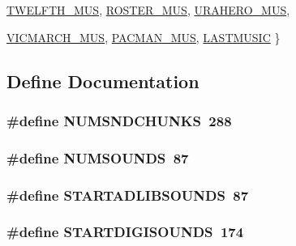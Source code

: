 \begin{DoxyCompactItemize}
\hyperlink{BUDIOWL6_8H_a196fbe29c4c02d90973f0b611ed0958ba2daba453f800e809bfb4fca6124da377}{TWELFTH\_\-MUS}, 
\hyperlink{BUDIOWL6_8H_a196fbe29c4c02d90973f0b611ed0958ba69e9e273ab13839b09e0976829002046}{ROSTER\_\-MUS}, 
\hyperlink{BUDIOWL6_8H_a196fbe29c4c02d90973f0b611ed0958ba7a71704b46eb8baaa32e6f817634328d}{URAHERO\_\-MUS}, 
\par
\hyperlink{BUDIOWL6_8H_a196fbe29c4c02d90973f0b611ed0958ba26a6deb65452e9b3f46d3e8571d2d2f7}{VICMARCH\_\-MUS}, 
\hyperlink{BUDIOWL6_8H_a196fbe29c4c02d90973f0b611ed0958ba69e6ef1a3a2ca4f191c98b37d6a8f0a9}{PACMAN\_\-MUS}, 
\hyperlink{BUDIOWL6_8H_a196fbe29c4c02d90973f0b611ed0958ba4c2fa07a163e141352f7e828f629dd59}{LASTMUSIC}
 \}
\end{DoxyCompactItemize}


\subsection{Define Documentation}
\hypertarget{AUDIOWL6_8H_adb660029e11963733384781d8bd6dc24}{
\subsubsection[{NUMSNDCHUNKS}]{\setlength{\rightskip}{0pt plus 5cm}\#define NUMSNDCHUNKS~288}}
\label{AUDIOWL6_8H_adb660029e11963733384781d8bd6dc24}
\hypertarget{AUDIOWL6_8H_aa948e91a657468d5faa690ec1a89230b}{
\subsubsection[{NUMSOUNDS}]{\setlength{\rightskip}{0pt plus 5cm}\#define NUMSOUNDS~87}}
\label{AUDIOWL6_8H_aa948e91a657468d5faa690ec1a89230b}
\hypertarget{AUDIOWL6_8H_a7d40bf6bf62cde9ae5f212e063328200}{
\subsubsection[{STARTADLIBSOUNDS}]{\setlength{\rightskip}{0pt plus 5cm}\#define STARTADLIBSOUNDS~87}}
\label{AUDIOWL6_8H_a7d40bf6bf62cde9ae5f212e063328200}
\hypertarget{AUDIOWL6_8H_adb5a42984ba81d350a944cc41434a6f7}{
\subsubsection[{STARTDIGISOUNDS}]{\setlength{\rightskip}{0pt plus 5cm}\#define STARTDIGISOUNDS~174}}
